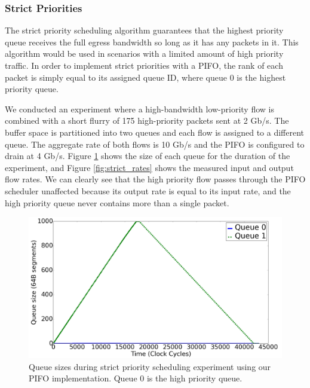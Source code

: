 \subsubsection*{Strict Priorities}

The strict priority scheduling algorithm guarantees that the highest priority queue receives the full egress bandwidth so long as it has any packets in it. This algorithm would be used in scenarios with a limited amount of high priority traffic. In order to implement strict priorities with a PIFO, the rank of each packet is simply equal to its assigned queue ID, where queue 0 is the highest priority queue.

We conducted an experiment where a high-bandwidth low-priority flow is combined with a short flurry of 175 high-priority packets sent at 2 Gb/s. The buffer space is partitioned into two queues and each flow is assigned to a different queue. The aggregate rate of both flows is 10 Gb/s and the PIFO is configured to drain at 4 Gb/s. Figure \ref{fig:strict_queues} shows the size of each queue for the duration of the experiment, and Figure \ref{fig:strict_rates} shows the measured input and output flow rates. We can clearly see that the high priority flow passes through the PIFO scheduler unaffected because its output rate is equal to its input rate, and the high priority queue never contains more than a single packet.

\begin{figure}[!h]
\includegraphics[width=1\linewidth]{figures/eval/strict_queues}
\caption{Queue sizes during strict priority scheduling experiment using our PIFO implementation. Queue 0 is the high priority queue.}
\label{fig:strict_queues}
\end{figure}

